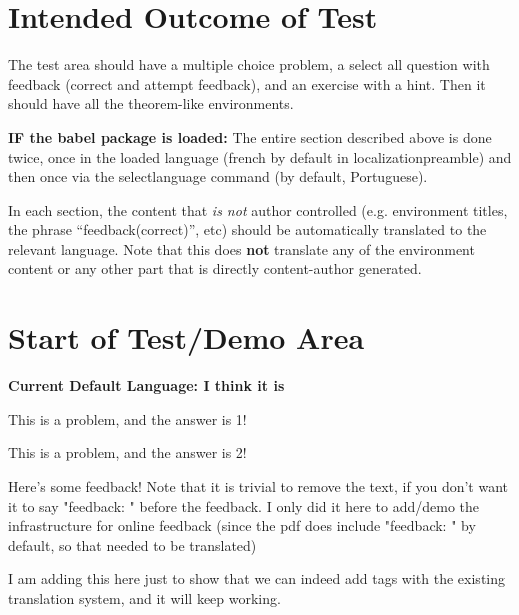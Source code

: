 \documentclass{ximera}
\begin{document}
\section{Intended Outcome of Test}

The test area should have a multiple choice problem, a select all question with feedback (correct and attempt feedback), 
and an exercise with a hint. Then it should have all the theorem-like environments.

\textbf{IF the babel package is loaded:} The entire section described above is done twice, once in the loaded language (french by default in localizationpreamble)
and then once via the selectlanguage command (by default, Portuguese).

In each section, the content that \textit{is not} author controlled (e.g. environment titles, the phrase ``feedback(correct)'', etc)
should be automatically translated to the relevant language. Note that this does \textbf{not} translate any of the environment
content or any other part that is directly content-author generated.


\section{Start of Test/Demo Area}

{{\bfseries\large Current Default Language: I think it is \languagename{}}}


\begin{problem}%
    This is a problem, and the answer is 1! %
    \begin{multipleChoice}
    \end{multipleChoice}%
\end{problem}

\begin{question}
    This is a problem, and the answer is 2! %
    \begin{selectAll}
    \end{selectAll}%
    \begin{feedback}
        Here's some feedback! Note that it is trivial to remove the text, if you don't want it to say "feedback: " before the feedback. I only did it here to add/demo the infrastructure for online feedback (since the pdf does include "feedback: " by default, so that needed to be translated)%
    \end{feedback}
    \begin{feedback}[correct]
        I am adding this here just to show that we can indeed add tags with the existing translation system, and it will keep working.%
    \end{feedback}
\end{question}
\end{document}

